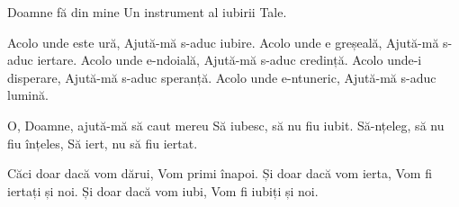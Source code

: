 
\beginchorus
Doamne fă din mine
Un instrument al iubirii Tale.
\endchorus

\beginverse
Acolo unde este ură,
Ajută-mă s-aduc iubire.
Acolo unde e greșeală,
Ajută-mă s-aduc iertare.
Acolo unde e-ndoială,
Ajută-mă s-aduc credință.
Acolo unde-i disperare,
Ajută-mă s-aduc speranță.
Acolo unde e-ntuneric,
Ajută-mă s-aduc lumină.
\endverse

\beginverse
O, Doamne, ajută-mă să caut mereu
Să iubesc, să nu fiu iubit.
Să-nțeleg, să nu fiu înțeles,
Să iert, nu să fiu iertat.
\endverse

\beginverse
Căci doar dacă vom dărui,
Vom primi înapoi.
Și doar dacă vom ierta,
Vom fi iertați și noi.
Și doar dacă vom iubi,
Vom fi iubiți și noi.
\endverse

\endsong

